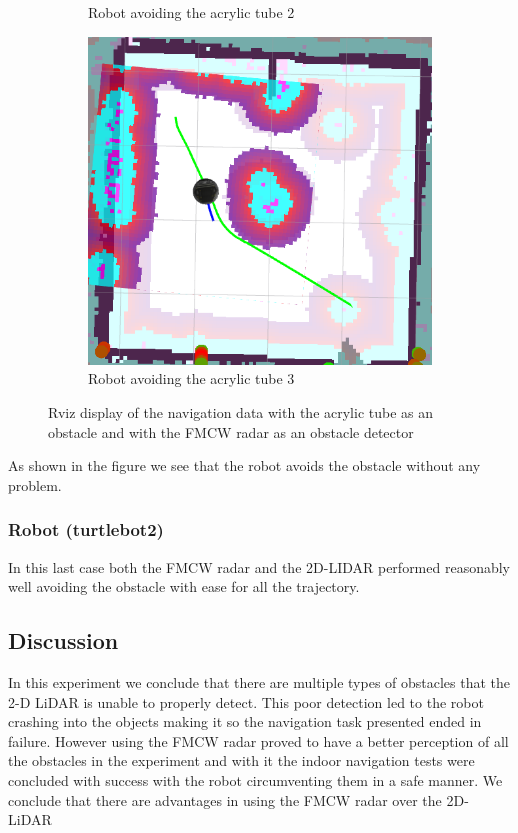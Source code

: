 \begin{figure}[ht!]
\begin{subfigure}[t]{0.3\linewidth}
    \caption{Robot avoiding the acrylic tube 2}
    \label{fig::rvizglassradar2}
  \end{subfigure}
   \begin{subfigure}[t]{0.3\linewidth}
    \includegraphics[width=\linewidth]{imgs/chapter5/glassradar3.png}
    \caption{Robot avoiding the acrylic tube 3}
    \label{fig::rvizglassradar3}
  \end{subfigure}
  \caption{Rviz display of the navigation data with the acrylic tube  as an obstacle and with the \ac{FMCW} \ac{radar} as an obstacle detector}
  \label{fig::rvizglassradar}
\end{figure}
As shown in the figure we see that the robot avoids the obstacle without any problem.

\subsubsection{Robot  (turtlebot2) }
In this last case both the \ac{FMCW} \ac{radar} and the 2D-LIDAR performed reasonably well avoiding the obstacle with ease for all the trajectory.

\subsection{Discussion}
In this experiment we conclude that there are multiple types of obstacles that the 2-D LiDAR is unable to properly detect. This poor detection led to the robot crashing into the objects making it so the navigation task presented ended in failure. However using the \ac{FMCW} radar proved to have a better perception of all the obstacles in the experiment and with it the indoor navigation tests were concluded with success with the robot circumventing them in a safe manner. We conclude that there are advantages in using the \ac{FMCW} \ac{radar} over the 2D-\ac{LiDAR}


